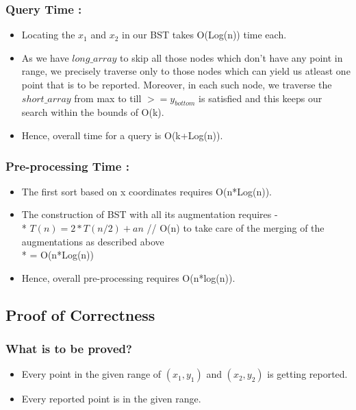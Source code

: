 \documentclass{article}
\begin{document}
\subsubsection{Query Time : }
\begin{itemize}
\item Locating the $x_1$ and $x_2$ in our BST takes O(Log(n)) time each.
\item As we have $long\_{array}$ to skip all those nodes which don't have any point in range, we precisely traverse only to those nodes which can yield us atleast one point that is to be reported. Moreover, in each such node, we traverse the $short\_array$ from max to till $>=y_{bottom}$ is satisfied and this keeps our search within the bounds of O(k).
\item Hence, overall time for a query is O(k+Log(n)). 
\end{itemize}
\subsubsection{Pre-processing Time : }
\begin{itemize}
\item The first sort based on x coordinates requires O(n*Log(n)).
\item The construction of BST with all its augmentation requires - \\*
$T(n) = 2*T(n/2) + an$ // O(n) to take care of the merging of the augmentations as described above \\*
= O(n*Log(n))
\item Hence, overall pre-processing requires O(n*log(n)).  

\end{itemize}
\subsection{Proof of Correctness}
\subsubsection{What is to be proved?}
\begin{itemize}
\item Every point in the given range of $(x_1,y_1)$ and $(x_2,y_2)$ is getting reported.
\item Every reported point is in the given range.
\end{itemize}
\end{document}
